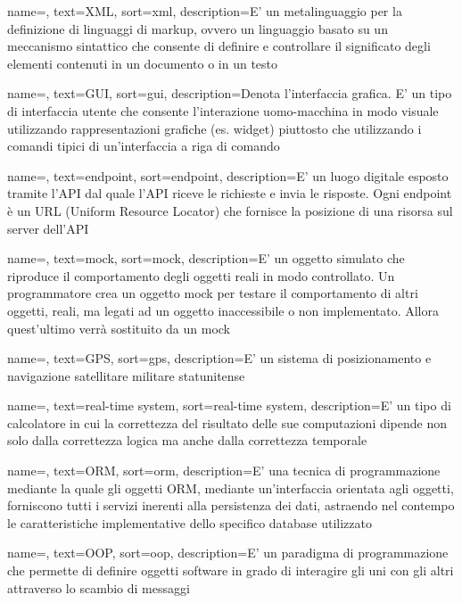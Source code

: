 {
    name=,
    text=XML,
    sort=xml,
    description={E' un metalinguaggio per la definizione di linguaggi di markup, ovvero un linguaggio basato su un meccanismo sintattico che consente di definire e controllare il significato degli elementi contenuti in un documento o in un testo}
}

{
    name=,
    text=GUI,
    sort=gui,
    description={Denota l'interfaccia grafica. E' un tipo di interfaccia utente che consente l'interazione uomo-macchina in modo visuale utilizzando rappresentazioni grafiche (es. widget) piuttosto che utilizzando i comandi tipici di un'interfaccia a riga di comando}
}

{
    name=,
    text=endpoint,
    sort=endpoint,
    description={E' un luogo digitale esposto tramite l'API dal quale l'API riceve le richieste e invia le risposte. Ogni endpoint è un URL (Uniform Resource Locator) che fornisce la posizione di una risorsa sul server dell'API}
}

{
    name=,
    text=mock,
    sort=mock,
    description={E' un oggetto simulato che riproduce il comportamento degli oggetti reali in modo controllato. Un programmatore crea un oggetto mock per testare il comportamento di altri oggetti, reali, ma legati ad un oggetto inaccessibile o non implementato. Allora quest'ultimo verrà sostituito da un mock}
}

{
    name=,
    text=GPS,
    sort=gps,
    description={E' un sistema di posizionamento e navigazione satellitare militare statunitense}
}

{
    name=,
    text=real-time system,
    sort=real-time system,
    description={E' un tipo di calcolatore in cui la correttezza del risultato delle sue computazioni dipende non solo dalla correttezza logica ma anche dalla correttezza temporale}
}

{
    name=,
    text=ORM,
    sort=orm,
    description={E' una tecnica di programmazione mediante la quale gli oggetti ORM, mediante un'interfaccia orientata agli oggetti, forniscono tutti i servizi inerenti alla persistenza dei dati, astraendo nel contempo le caratteristiche implementative dello specifico database utilizzato}
}

{
    name=,
    text=OOP,
    sort=oop,
    description={E' un paradigma di programmazione che permette di definire oggetti software in grado di interagire gli uni con gli altri attraverso lo scambio di messaggi}
}

